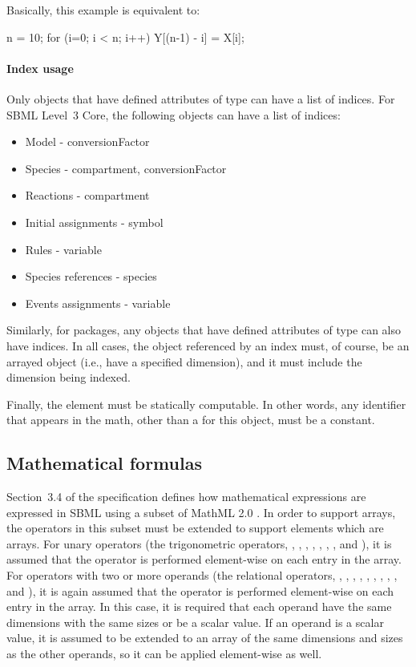 Basically, this example is equivalent to:

\begin{example}
n = 10;
for (i=0; i < n; i++) {
    Y[(n-1) - i] = X[i];
}
\end{example}

\paragraph{Index usage}

Only objects that have defined attributes of  type can have a list of indices.  For SBML Level~3 Core, the following objects can have a list of indices:
\begin{itemize}
\item Model - conversionFactor
\item Species - compartment, conversionFactor
\item Reactions - compartment
\item Initial assignments - symbol
\item Rules - variable
\item Species references - species
\item Events assignments - variable
\end{itemize}
Similarly, for packages, any objects that have defined attributes of  type can also have indices.  In all cases, the object referenced by an index must, of course, be an arrayed object (i.e., have a specified dimension), and it must include the dimension being indexed.

Finally, the  element must be statically computable.  In other words, any identifier that appears in the math, other than a \Dimension {} for this object, must be a constant.

\subsection{Mathematical formulas}
\label{math-formulas}
Section~3.4 of the \sbmlthreecore specification defines how mathematical expressions are expressed in SBML using a subset of MathML 2.0 \citep{w3c:2000b}.  In order to support arrays, the operators in this subset must be extended to support  elements which are arrays.  For unary operators (the trigonometric operators, , , , , , , , and ), it is assumed that the operator is performed element-wise on each entry in the array.  For operators with two or more operands (the relational operators, , , , , , , , , , and ), it is again assumed that the operator is performed element-wise on each entry in the array.  In this case, it is required that each operand have the same dimensions with the same sizes or be a scalar value.  If an operand is a scalar value, it is assumed to be extended to an array of the same dimensions and sizes as the other operands, so it can be applied element-wise as well.  

